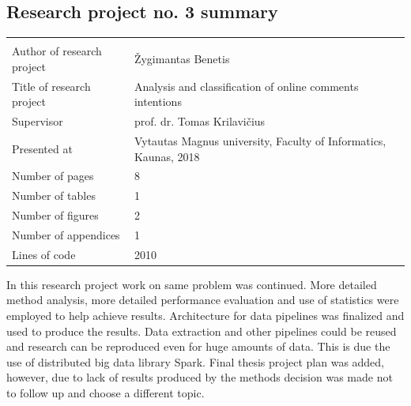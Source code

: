 \documentclass[a4paper,12pt]{article}
\begin{document}
	\clearpage
    
    
    	\subsection{Research project no. 3 summary}
    
    
    \noindent
    \begin{center}
		\begin{tabular}{L{4.5cm} L{8cm}}
    		\\ 
    		Author of research project & Žygimantas Benetis \\
    		Title of research project & Analysis and classification of online comments intentions\\
    		Supervisor & prof. dr. Tomas Krilavičius\\
    		Presented at & Vytautas Magnus university, Faculty of Informatics, Kaunas, 2018\\
    		Number of pages & 8\\
    		Number of tables & 1\\
    		Number of figures & 2\\
    		Number of appendices & 1\\
    		Lines of code & 2010\\
    	\end{tabular}
    \end{center} 

	\vspace{5mm}
    
    In this research project work on same problem was continued. More detailed method analysis, more detailed performance evaluation and use of statistics were employed to help achieve results. Architecture for data pipelines was finalized and used to produce the results. Data extraction and other pipelines could be reused and research can be reproduced even for huge amounts of data. This is due the use of distributed big data library Spark. Final thesis project plan was added, however, due to lack of results produced by the methods decision was made not to follow up and choose a different topic.
    
    \clearpage
    
    
\end{document}
